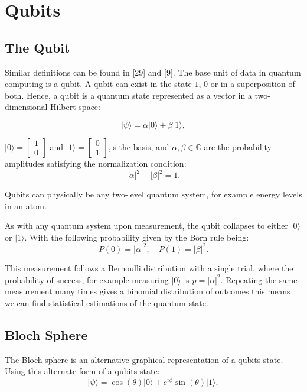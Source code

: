 \section{Qubits}

\subsection{The Qubit}

Similar definitions can be found in [29] and [9]. The base unit of data in quantum computing is a qubit. A qubit can exist in the state $1$, $0$ or in a superposition of both. Hence, a qubit is a quantum state represented as a vector in a two-dimensional Hilbert space:

\[
|\psi\rangle = \alpha |0\rangle + \beta |1\rangle,
\]

\noindent$|0\rangle = \begin{bmatrix}1 \\ 0\end{bmatrix}$ and $|1\rangle = \begin{bmatrix}0 \\ 1\end{bmatrix}$,is the basis, and $\alpha, \beta \in \mathbb{C}$ are the probability amplitudes satisfying the normalization condition:
\[
|\alpha|^2 + |\beta|^2 = 1.
\]

\noindent Qubits can physically be any two-level quantum system, for example energy levels in an atom.

\noindent As with any quantum system upon measurement, the qubit collapses to either $|0\rangle$ or $|1\rangle$. With the following probability given by the Born rule being:
\[
P(0) = |\alpha|^2, \quad P(1) = |\beta|^2.
\]

\noindent This measurement follows a Bernoulli distribution with a single trial, where the probability of success, for example measuring $|0\rangle$ is $p = |\alpha|^2$. Repeating the same measurement many times gives a binomial distribution of outcomes this means we can find statistical estimations of the quantum state.


\subsection{Bloch Sphere}

The Bloch sphere is an alternative graphical representation of a qubits state. Using this alternate form of a qubits state:
\[
|\psi\rangle = \cos(\theta) |0\rangle + e^{i\phi} \sin(\theta) |1\rangle,
\]

